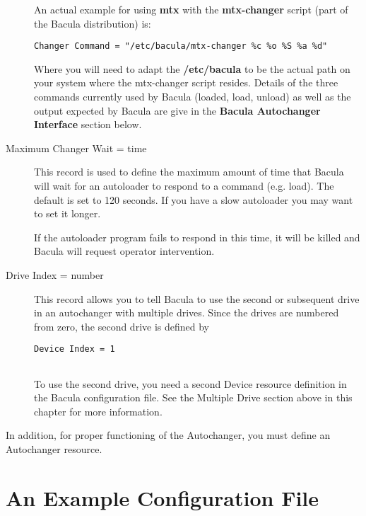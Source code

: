 \begin{description}
An actual example for using {\bf mtx} with the  {\bf mtx-changer} script (part
of the Bacula distribution) is:  

\footnotesize
\begin{verbatim}
Changer Command = "/etc/bacula/mtx-changer %c %o %S %a %d"
\end{verbatim}
\normalsize

Where you will need to adapt the {\bf /etc/bacula} to be  the actual path on
your system where the mtx-changer script  resides.  Details of the three
commands currently used by Bacula  (loaded, load, unload) as well as the
output expected by  Bacula are give in the {\bf Bacula Autochanger Interface} 
section below.  

\item [Maximum Changer Wait = \lt{}time\gt{}]
   This record is used to define the maximum amount of time that Bacula
   will wait for an autoloader to respond to a command (e.g.  load).  The
   default is set to 120 seconds.  If you have a slow autoloader you may
   want to set it longer.

If the autoloader program fails to respond in this time, it  will be killed
and Bacula will request operator intervention.  

\item [Drive Index = \lt{}number\gt{}]
   This record allows you to tell Bacula to use the second or subsequent
   drive in an autochanger with multiple drives.  Since the drives are
   numbered from zero, the second drive is defined by

\footnotesize
\begin{verbatim}
Device Index = 1
      
\end{verbatim}
\normalsize

To use the second drive, you need a second Device resource definition  in the
Bacula configuration file. See the Multiple Drive section above  in this
chapter for more information. 
\end{description}

In addition, for proper functioning of the Autochanger, you must 
define an Autochanger resource.


\label{example}
\section{An Example Configuration File}

